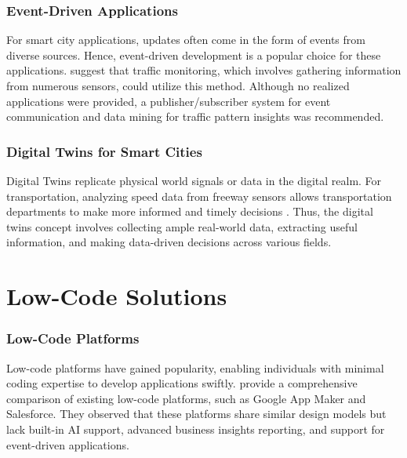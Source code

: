 \subsubsection{Event-Driven Applications}
For smart city applications, updates often come in the form of events from diverse sources. Hence, event-driven development is a popular choice for these applications. \citet{hinze2009event} suggest that traffic monitoring, which involves gathering information from numerous sensors, could utilize this method. Although no realized applications were provided, a publisher/subscriber system for event communication and data mining for traffic pattern insights was recommended.

\subsubsection{Digital Twins for Smart Cities}
Digital Twins replicate physical world signals or data in the digital realm. For transportation, analyzing speed data from freeway sensors allows transportation departments to make more informed and timely decisions \citet{hu2021digital}. Thus, the digital twins concept involves collecting ample real-world data, extracting useful information, and making data-driven decisions across various fields.

\section{Low-Code Solutions}
\subsubsection{Low-Code Platforms}
Low-code platforms have gained popularity, enabling individuals with minimal coding expertise to develop applications swiftly. \citet{sahay2020supporting} provide a comprehensive comparison of existing low-code platforms, such as Google App Maker and Salesforce. They observed that these platforms share similar design models but lack built-in AI support, advanced business insights reporting, and support for event-driven applications.

